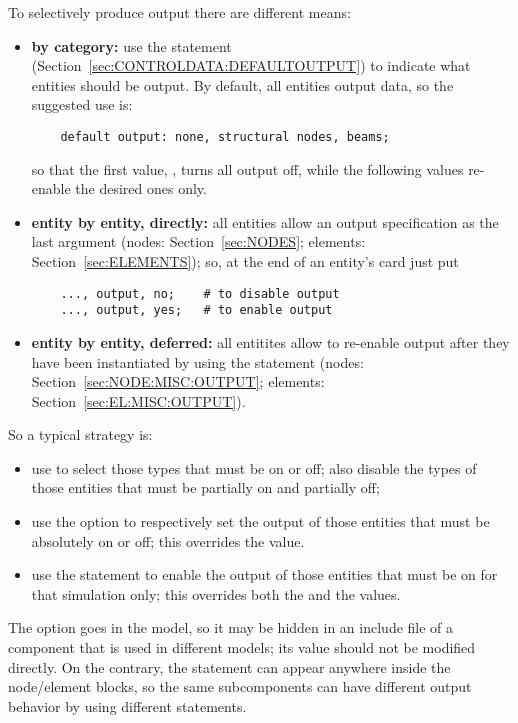 To selectively produce output there are different means:
\begin{itemize}
\item \textbf{by category:} use the  statement
(Section~\ref{sec:CONTROLDATA:DEFAULTOUTPUT}) to indicate what entities
should be output.
By default, all entities output data, so the suggested use is:
\begin{verbatim}
    default output: none, structural nodes, beams;
\end{verbatim}
so that the first value, , turns all output off, while the
following values re-enable the desired ones only.

\item \textbf{entity by entity, directly:}
all entities allow an output specification as the last argument
(nodes: Section~\ref{sec:NODES}; elements: Section~\ref{sec:ELEMENTS});
so, at the end of an entity's card just put
\begin{verbatim}
    ..., output, no;    # to disable output
    ..., output, yes;   # to enable output
\end{verbatim}

\item \textbf{entity by entity, deferred:}
all entitites allow to re-enable output after they have
been instantiated by using the  statement
(nodes: Section~\ref{sec:NODE:MISC:OUTPUT};
elements: Section~\ref{sec:EL:MISC:OUTPUT}).
\end{itemize}

So a typical strategy is:
\begin{itemize}
\item use  to select those types that must be on or off;
also disable the types of those entities that must be partially 
on and partially off;
\item use the  option to respectively set the output
of those entities that must be absolutely on or off; this overrides
the  value.
\item use the  statement to enable the output of those
entities that must be on for that simulation only; this overrides
both the  and the  values.
\end{itemize}

The  option goes in the model, so it may be hidden 
in an include file of a component that is used in different models;
its value should not be modified directly.
On the contrary, the  statement can appear anywhere
inside the node/element blocks, so the same subcomponents can have
different output behavior by using different  statements.

